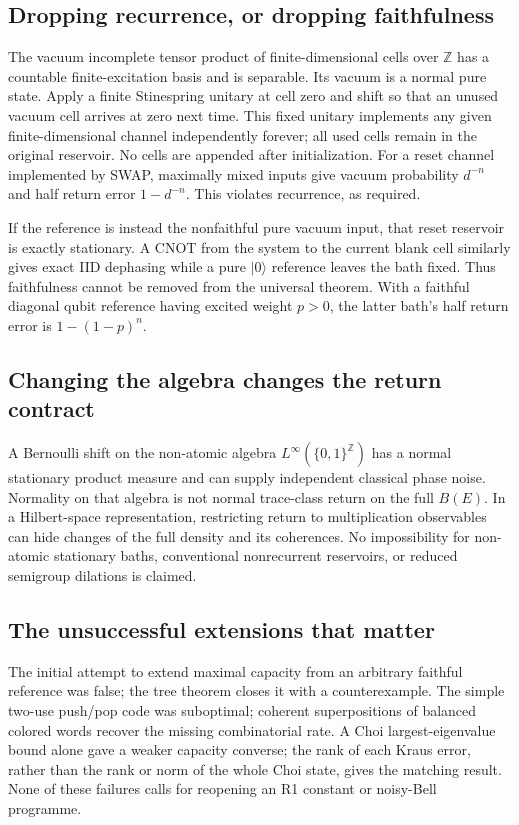 \documentclass[11pt]{article}
\theoremstyle{definition}\newtheorem{definition}[theorem]{Definition}
\newcommand{\ket}[1]{\lvert #1\rangle}
\begin{document}
\subsection{Dropping recurrence, or dropping faithfulness}
The vacuum incomplete tensor product of finite-dimensional cells over $\mathbb Z$ has a countable finite-excitation basis and is separable. Its vacuum is a normal pure state. Apply a finite Stinespring unitary at cell zero and shift so that an unused vacuum cell arrives at zero next time. This fixed unitary implements any given finite-dimensional channel independently forever; all used cells remain in the original reservoir. No cells are appended after initialization. For a reset channel implemented by SWAP, maximally mixed inputs give vacuum probability $d^{-n}$ and half return error $1-d^{-n}$. This violates recurrence, as required.

If the reference is instead the nonfaithful pure vacuum input, that reset reservoir is exactly stationary. A CNOT from the system to the current blank cell similarly gives exact IID dephasing while a pure $\ket0$ reference leaves the bath fixed. Thus faithfulness cannot be removed from the universal theorem. With a faithful diagonal qubit reference having excited weight $p>0$, the latter bath's half return error is $1-(1-p)^n$.

\subsection{Changing the algebra changes the return contract}
A Bernoulli shift on the non-atomic algebra $L^\infty(\{0,1\}^{\mathbb Z})$ has a normal stationary product measure and can supply independent classical phase noise. Normality on that algebra is not normal trace-class return on the full $B(E)$. In a Hilbert-space representation, restricting return to multiplication observables can hide changes of the full density and its coherences. No impossibility for non-atomic stationary baths, conventional nonrecurrent reservoirs, or reduced semigroup dilations is claimed.

\subsection{The unsuccessful extensions that matter}
The initial attempt to extend maximal capacity from an arbitrary faithful reference was false; the tree theorem closes it with a counterexample. The simple two-use push/pop code was suboptimal; coherent superpositions of balanced colored words recover the missing combinatorial rate. A Choi largest-eigenvalue bound alone gave a weaker capacity converse; the rank of each Kraus error, rather than the rank or norm of the whole Choi state, gives the matching result. None of these failures calls for reopening an R1 constant or noisy-Bell programme.
\end{document}
